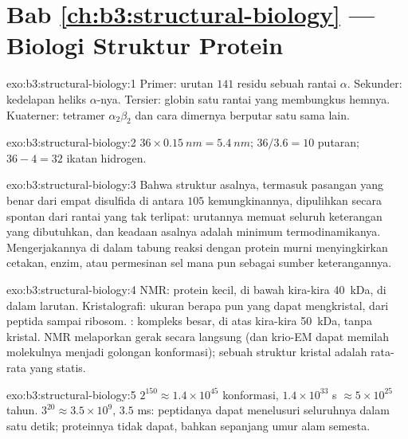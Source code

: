 \section*{Bab \ref{ch:b3:structural-biology} --- Biologi Struktur Protein}

\begin{solution}{exo:b3:structural-biology:1}
Primer: urutan $141$ residu sebuah rantai $\alpha$.
Sekunder: kedelapan heliks $\alpha$-nya. Tersier:  globin satu
rantai yang membungkus hemnya. Kuaterner: tetramer $\alpha_{2}\beta_{2}$
dan cara dimernya berputar satu sama lain.
\end{solution}

\begin{solution}{exo:b3:structural-biology:2}
$36\times \qty{0.15}{nm} = \qty{5.4}{nm}$; $36/3.6 = 10$ putaran;
$36 - 4 = 32$ ikatan hidrogen.
\end{solution}

\begin{solution}{exo:b3:structural-biology:3}
Bahwa struktur asalnya, termasuk pasangan yang benar dari empat
disulfida di antara $105$ kemungkinannya, dipulihkan secara spontan dari
rantai yang tak terlipat: urutannya memuat seluruh keterangan yang
dibutuhkan, dan keadaan asalnya adalah minimum termodinamikanya. Mengerjakannya
di dalam tabung reaksi dengan protein murni menyingkirkan cetakan, enzim, atau
permesinan sel mana pun sebagai sumber keterangannya.
\end{solution}

\begin{solution}{exo:b3:structural-biology:4}
NMR: protein kecil, di bawah kira-kira \qty{40}{kDa}, di dalam larutan.
Kristalografi: ukuran berapa pun yang dapat mengkristal, dari peptida sampai
ribosom. : kompleks besar, di atas kira-kira
\qty{50}{kDa}, tanpa kristal. NMR melaporkan gerak secara langsung (dan
krio-EM dapat memilah molekulnya menjadi golongan konformasi); sebuah struktur
kristal adalah rata-rata yang statis.
\end{solution}

\begin{solution}{exo:b3:structural-biology:5}
$2^{150} \approx 1.4\times 10^{45}$ konformasi, $1.4\times 10^{33}$
s $\approx 5\times 10^{25}$ tahun. $3^{20} \approx 3.5\times 10^{9}$,
$3.5$ ms: peptidanya dapat menelusuri seluruhnya dalam satu detik;
proteinnya tidak dapat, bahkan sepanjang umur alam semesta.
\end{solution}

